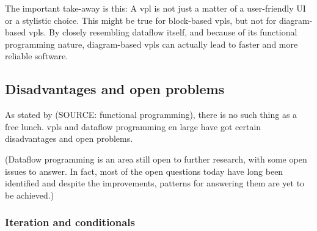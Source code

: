 

The important take-away is this: 
A \ac{vpl} is not just a matter of a user-friendly UI or a stylistic choice.
This might be true for block-based vpls, but not for diagram-based vpls. 
By closely resembling dataflow itself, and because of its functional programming nature, diagram-based vpls can actually lead to faster and more reliable software.

\subsection{Disadvantages and open problems}
\label{sec:background:vpl:disadvantages}

As stated by (SOURCE: functional programming), there is no such thing as a free lunch. 
\ac{vpl}s and dataflow programming en large have got certain disadvantages and open problems.

(Dataflow programming is an area still open to further research, with some open
issues to answer. In fact, most of the open questions today have long been
identified and despite the improvements, patterns for answering them are yet to
be achieved.)



\subsubsection*{Iteration and conditionals}

